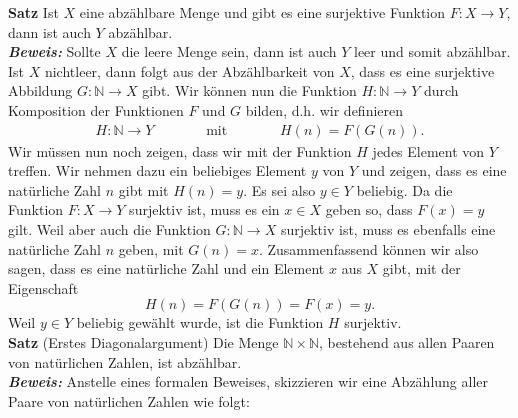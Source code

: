 \textbf{Satz } Ist $X$ eine abzählbare Menge und gibt es eine surjektive Funktion $F:X\to Y$, dann ist auch $Y$ abzählbar. \\
\textit{\textbf{Beweis: }} 
Sollte $X$ die leere Menge sein, dann ist auch $Y$ leer und somit abzählbar. Ist $X$ nichtleer, dann folgt aus der Abzählbarkeit von $X$, dass es eine surjektive Abbildung $G:\mathbb{N}\to X$ gibt. Wir können nun die Funktion $H:\mathbb{N}\to Y$ durch Komposition der Funktionen $F$ und $G$ bilden, d.h. wir definieren
\begin{align*}
H:\mathbb{N}\to Y\phantom{abstand}\text{ mit }\phantom{abstand} H(n)=F(G(n)).
\end{align*}
Wir müssen nun noch zeigen, dass wir mit der Funktion $H$ jedes Element von $Y$ treffen. Wir nehmen dazu ein beliebiges Element $y$ von $Y$ und zeigen, dass es eine natürliche Zahl $n$ gibt mit $H(n)=y$. Es sei also $y\in Y$ beliebig. Da die Funktion $F:X\to Y$ surjektiv ist, muss es ein $x\in X$ geben so, dass $F(x)=y$ gilt. Weil aber auch die Funktion $G:\mathbb{N}\to X$ surjektiv ist, muss es ebenfalls eine natürliche Zahl $n$ geben, mit $G(n)=x$. Zusammenfassend können wir also sagen, dass es eine natürliche Zahl und ein Element $x$ aus $X$ gibt, mit der Eigenschaft
\[
H(n)=F(G(n))=F(x)=y.
\]
Weil $y\in Y$ beliebig gewählt wurde, ist die Funktion $H$ surjektiv. \\

\textbf{Satz} (Erstes Diagonalargument) 
Die Menge $\mathbb{N}\times\mathbb{N}$, bestehend aus allen Paaren von natürlichen Zahlen, ist abzählbar.\\
\textit{\textbf{Beweis: }} 
Anstelle eines formalen Beweises, skizzieren wir eine Abzählung aller Paare von natürlichen Zahlen wie folgt:
\begin{center}
\end{center}
\ %

